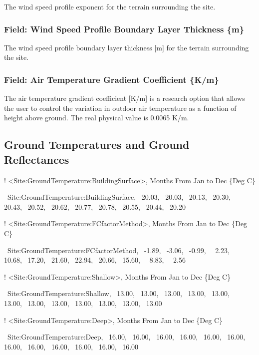 The wind speed profile exponent for the terrain surrounding the site.

\subsubsection{Field: Wind Speed Profile Boundary Layer Thickness \{m\}}\label{field-wind-speed-profile-boundary-layer-thickness-m-1}

The wind speed profile boundary layer thickness {[}m{]} for the terrain surrounding the site.

\subsubsection{Field: Air Temperature Gradient Coefficient \{K/m\}}\label{field-air-temperature-gradient-coefficient-km}

The air temperature gradient coefficient {[}K/m{]} is a research option that allows the user to control the variation in outdoor air temperature as a function of height above ground. The real physical value is 0.0065 K/m.

\subsection{Ground Temperatures and Ground Reflectances}\label{ground-temperatures-and-ground-reflectances}

! \textless{}Site:GroundTemperature:BuildingSurface\textgreater{}, Months From Jan to Dec \{Deg C\}

~Site:GroundTemperature:BuildingSurface,~ 20.03,~ 20.03,~ 20.13,~ 20.30,~ 20.43,~ 20.52,~ 20.62,~ 20.77,~ 20.78,~ 20.55,~ 20.44,~ 20.20

! \textless{}Site:GroundTemperature:FCfactorMethod\textgreater{}, Months From Jan to Dec \{Deg C\}

~Site:GroundTemperature:FCfactorMethod,~ -1.89,~ -3.06,~ -0.99,~~ 2.23,~ 10.68,~ 17.20,~ 21.60,~ 22.94,~ 20.66,~ 15.60,~~ 8.83,~~ 2.56

! \textless{}Site:GroundTemperature:Shallow\textgreater{}, Months From Jan to Dec \{Deg C\}

~Site:GroundTemperature:Shallow,~ 13.00,~ 13.00,~ 13.00,~ 13.00,~ 13.00,~ 13.00,~ 13.00,~ 13.00,~ 13.00,~ 13.00,~ 13.00,~ 13.00

! \textless{}Site:GroundTemperature:Deep\textgreater{}, Months From Jan to Dec \{Deg C\}

~Site:GroundTemperature:Deep,~ 16.00,~ 16.00,~ 16.00,~ 16.00,~ 16.00,~ 16.00,~ 16.00,~ 16.00,~ 16.00,~ 16.00,~ 16.00,~ 16.00

